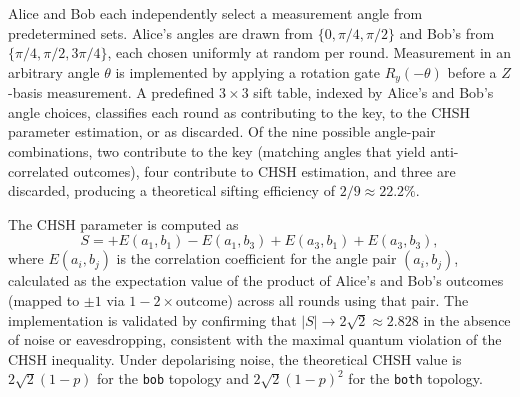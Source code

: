 Alice and Bob each independently select a measurement angle from predetermined sets. Alice's angles are drawn from $\{0, \pi/4, \pi/2\}$ and Bob's from $\{\pi/4, \pi/2, 3\pi/4\}$, each chosen uniformly at random per round. Measurement in an arbitrary angle $\theta$ is implemented by applying a rotation gate $R_y(-\theta)$ before a $Z$-basis measurement. A predefined $3 \times 3$ sift table, indexed by Alice's and Bob's angle choices, classifies each round as contributing to the key, to the CHSH parameter estimation, or as discarded. Of the nine possible angle-pair combinations, two contribute to the key (matching angles that yield anti-correlated outcomes), four contribute to CHSH estimation, and three are discarded, producing a theoretical sifting efficiency of $2/9 \approx 22.2\%$.

The CHSH parameter is computed as
%
\begin{equation}
\label{eq:chsh-computation}
S = +E(a_1, b_1) - E(a_1, b_3) + E(a_3, b_1) + E(a_3, b_3),
\end{equation}
%
where $E(a_i, b_j)$ is the correlation coefficient for the angle pair $(a_i, b_j)$, calculated as the expectation value of the product of Alice's and Bob's outcomes (mapped to $\pm 1$ via $1 - 2 \times \text{outcome}$) across all rounds using that pair. The implementation is validated by confirming that $|S| \rightarrow 2\sqrt{2} \approx 2.828$ in the absence of noise or eavesdropping, consistent with the maximal quantum violation of the CHSH inequality. Under depolarising noise, the theoretical CHSH value is $2\sqrt{2}(1-p)$ for the \texttt{bob} topology and $2\sqrt{2}(1-p)^2$ for the \texttt{both} topology.

